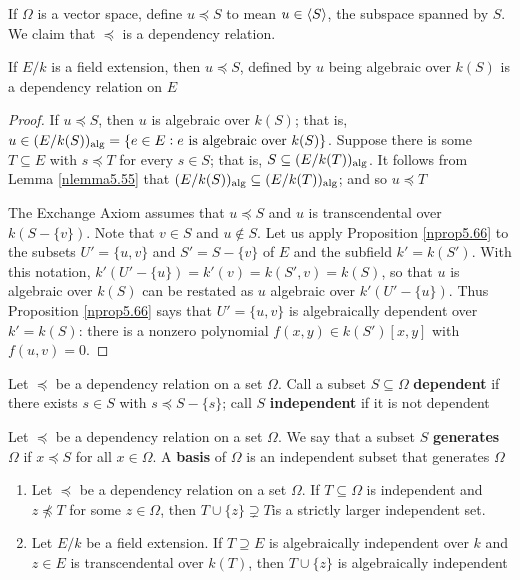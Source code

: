 \documentclass[11pt]{article}
\begin{document}
\begin{examplle}[]
If \(\Omega\) is a vector space, define \(u\preceq S\) to mean \(u\in\langle S\rangle\), the
subspace spanned by \(S\). We claim that \(\preceq\) is a dependency relation.
\end{examplle}

\begin{lemma}[]
If \(E/k\) is a field extension, then \(u\preceq S\), defined by \(u\) being
algebraic over \(k(S)\) is a dependency relation on \(E\)
\end{lemma}

\begin{proof}
If \(u\preceq S\), then \(u\) is algebraic over \(k(S)\); that is, 
\(u\in(E/k(S))_{\operatorname{\text{alg}}}=\{e\in E:e\text{ is algebraic over }k(S)\}\). Suppose
there is some \(T\subseteq E\) with \(s\preceq T\) for every \(s\in S\); that
is, \(S\subseteq(E/k(T))_{\operatorname{\text{alg}}}\). It follows from Lemma \ref{nlemma5.55} that 
\((E/k(S))_{\operatorname{\text{alg}}}\subseteq(E/k(T))_{\operatorname{\text{alg}}}\); and so \(u\preceq T\)

The Exchange Axiom assumes that \(u\preceq S\) and \(u\) is transcendental over
\(k(S-\{v\})\). Note that \(v\in S\) and \(u\not\in S\). Let us apply
Proposition \ref{nprop5.66} to the subsets \(U'=\{u,v\}\) and \(S'=S-\{v\}\) of
\(E\) and the subfield \(k'=k(S')\). With this notation,
\(k'(U'-\{u\})=k'(v)=k(S',v)=k(S)\), so that \(u\) is algebraic over \(k(S)\)
can be restated as \(u\)  algebraic over \(k'(U'-\{u\})\). Thus Proposition
\ref{nprop5.66} says that \(U'=\{u,v\}\) is algebraically dependent over
\(k'=k(S)\): there is a nonzero polynomial \(f(x,y)\in k(S')[x,y]\) with 
\(f(u,v)=0\).
\end{proof}

\begin{definition}[]
Let \(\preceq\) be a dependency relation on a set \(\Omega\). Call a subset
\(S\subseteq\Omega\) \textbf{dependent} if there exists \(s\in S\) with 
\(s\preceq S-\{s\}\); call \(S\) \textbf{independent} if it is not dependent
\end{definition}

\begin{definition}[]
Let \(\preceq\) be a dependency relation on a set \(\Omega\). We say that a subset \(S\)
\textbf{generates} \(\Omega\) if \(x\preceq S\) for all \(x\in\Omega\). A \textbf{basis} of \(\Omega\)
is an independent subset that generates \(\Omega\)
\end{definition}

\begin{lemma}[]
\label{nlemma5.69}
\begin{enumerate}
\item Let \(\preceq\) be a dependency relation on a set \(\Omega\). If
\(T\subseteq\Omega\) is independent and \(z\not\preceq T\) for some
\(z\in\Omega\), then \(T\cup\{z\}\supsetneq T\)is a strictly larger
independent set.
\item Let \(E/k\) be a field extension. If \(T\supseteq E\) is algebraically
independent over \(k\) and \(z\in E\) is transcendental over \(k(T)\), then 
\(T\cup\{z\}\) is algebraically independent
\end{enumerate}
\end{lemma}
\end{document}
